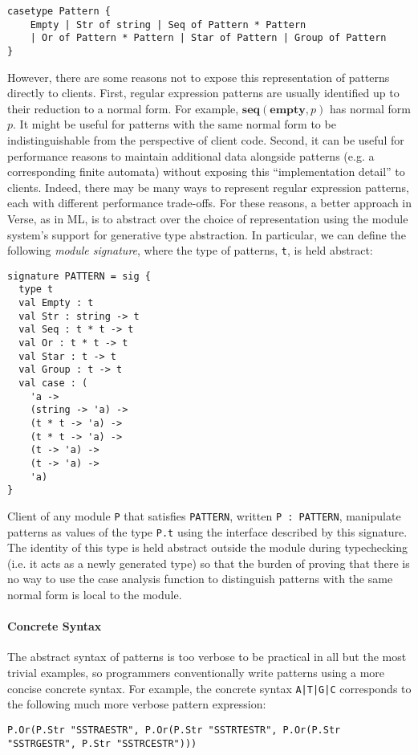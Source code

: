 \begin{lstlisting}[numbers=none]
casetype Pattern {
    Empty | Str of string | Seq of Pattern * Pattern 
    | Or of Pattern * Pattern | Star of Pattern | Group of Pattern
}
\end{lstlisting}

However, there are some reasons not to expose this representation of patterns directly to clients. First, regular expression patterns are usually identified up to their reduction to a normal form. For example, $\textbf{seq}(\textbf{empty}, p)$ has normal form $p$. It might be useful for patterns with the same normal form to be  indistinguishable from the perspective of client code. Second, it can be useful for performance reasons to maintain additional data alongside patterns (e.g. a corresponding finite automata) without exposing this ``implementation detail'' to clients. Indeed, there may be many ways to represent regular expression patterns, each with different performance trade-offs. For these reasons, a better approach in Verse, as in ML, is to abstract over the choice of representation using  the module system's support for generative type abstraction. In particular, we can define the following \emph{module signature}, where the type of patterns, \lstinline{t}, is held abstract:

\begin{lstlisting}[deletekeywords={case},numbers=none]
signature PATTERN = sig {
  type t
  val Empty : t
  val Str : string -> t
  val Seq : t * t -> t
  val Or : t * t -> t
  val Star : t -> t
  val Group : t -> t
  val case : (
    'a -> 
    (string -> 'a) ->
    (t * t -> 'a) ->
    (t * t -> 'a) ->
    (t -> 'a) ->
    (t -> 'a) -> 
    'a)
}
\end{lstlisting}
 Client of any module \lstinline{P} that satisfies \lstinline{PATTERN}, written \lstinline{P : PATTERN}, manipulate patterns as values of the type \verb|P.t| using the interface described by this signature. The identity of this type is held abstract outside the module during typechecking (i.e. it acts as a newly generated type) so that the burden of proving that there is no way to use the case analysis function to distinguish patterns with the same normal form is local to the module. %

\paragraph{Concrete Syntax} The abstract syntax of patterns is too verbose to be practical  in all but the most trivial examples, so programmers conventionally write patterns using a more concise concrete syntax. For example, the concrete syntax \lstinline{A|T|G|C} corresponds to the following much more verbose pattern expression:
\begin{lstlisting}[numbers=none,mathescape=|]
P.Or(P.Str "SSTRAESTR", P.Or(P.Str "SSTRTESTR", P.Or(P.Str "SSTRGESTR", P.Str "SSTRCESTR")))
\end{lstlisting} 



